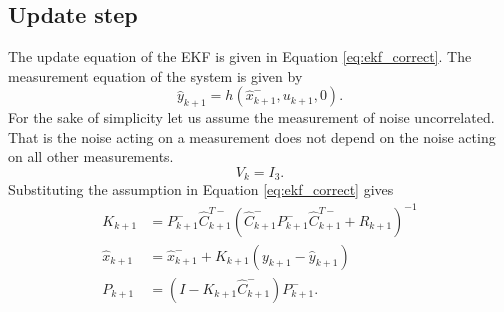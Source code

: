 \subsection{Update step}
\label{subsec:toro_update}
The update equation of the EKF is given in Equation \ref{eq:ekf_correct}. The measurement equation of the system is given by $$\hat{y}_{k+1} = h(\hat{x}_{k+1}^-,u_{k+1},0).$$ For the sake of simplicity let us assume the measurement of noise uncorrelated. That is the noise acting on a measurement does not depend on the noise acting on all other measurements. $$V_k = I_3.$$ Substituting the assumption in Equation \ref{eq:ekf_correct} gives
\begin{equation}
\label{eq:correct}
\begin{split}
K_{k+1} &= P_{k+1}^-\hat{C}_{k+1}^{T-}(\hat{C}_{k+1}^-P_{k+1}^-\hat{C}_{k+1}^{T-} + R_{k+1})^{-1}\\
\hat{x}_{k+1} &= \hat{x}_{k+1}^- + K_{k+1}(y_{k+1}-\hat{y}_{k+1})\\
P_{k+1} &= (I- K_{k+1}\hat{C}_{k+1}^-)P_{k+1}^-.
\end{split}
\end{equation}

